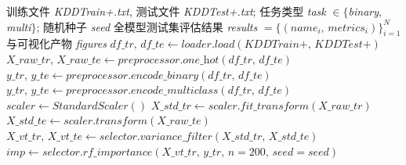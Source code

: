 
\begin{algorithm}
  \caption{NSL-KDD入侵检测实验总流程}
  \label{alg:nsl-kdd-pipeline}
  \small
  \begin{algorithmic}
    \REQUIRE 训练文件 \textit{KDDTrain+.txt}, 测试文件 \textit{KDDTest+.txt}; 任务类型
             \textit{task} $\in \{$\textit{binary}, \textit{multi}$\}$; 随机种子 \textit{seed}
    \ENSURE 全模型测试集评估结果 \textit{results} $= \{(\textit{name}_i,\, \textit{metrics}_i)\}_{i=1}^{N}$
           与可视化产物 \textit{figures}
    \STATE {}
    \STATE $\textit{df\_tr},\, \textit{df\_te} \gets \textit{loader.load}(\textit{KDDTrain+},\, \textit{KDDTest+})$
    \STATE {}
    \STATE $\textit{X\_raw\_tr},\, \textit{X\_raw\_te} \gets \textit{preprocessor.one\_hot}(\textit{df\_tr},\, \textit{df\_te})$
      \STATE {}
      \STATE $\textit{y\_tr},\, \textit{y\_te} \gets \textit{preprocessor.encode\_binary}(\textit{df\_tr},\, \textit{df\_te})$
    \ELSE
      \STATE {}
      \STATE $\textit{y\_tr},\, \textit{y\_te} \gets \textit{preprocessor.encode\_multiclass}(\textit{df\_tr},\, \textit{df\_te})$
    \ENDIF
    \STATE {}
    \STATE $\textit{scaler} \gets \textit{StandardScaler}()$
    \STATE $\textit{X\_std\_tr} \gets \textit{scaler.fit\_transform}(\textit{X\_raw\_tr})$
    \STATE $\textit{X\_std\_te} \gets \textit{scaler.transform}(\textit{X\_raw\_te})$
    \STATE {}
    \STATE $\textit{X\_vt\_tr},\, \textit{X\_vt\_te} \gets \textit{selector.variance\_filter}(\textit{X\_std\_tr},\, \textit{X\_std\_te})$
    \STATE $\textit{imp} \gets \textit{selector.rf\_importance}(\textit{X\_vt\_tr},\, \textit{y\_tr},\, n=200,\, \textit{seed}=\textit{seed})$

\end{algorithmic}
\end{algorithm}
